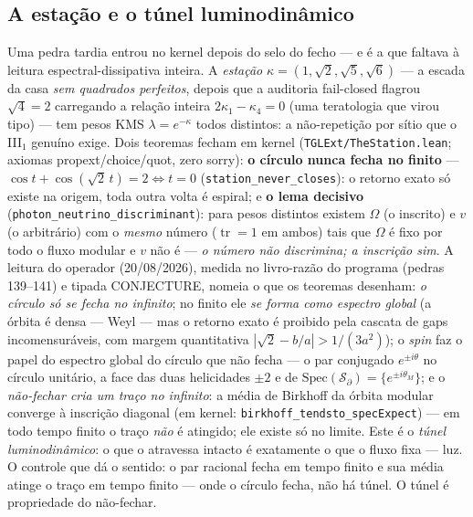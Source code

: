 \documentclass[11pt]{article}
\theoremstyle{definition}\newtheorem{deriv}{Derivação}
\begin{document}
\subsection*{A estação e o túnel luminodinâmico}Uma pedra tardia entrou no kernel depois do selo do fecho --- e é a que faltava à leitura espectral-dissipativa inteira. A \emph{estação} $\kappa=(1,\sqrt2,\sqrt5,\sqrt6)$ --- a escada da casa \emph{sem quadrados perfeitos}, depois que a auditoria fail-closed flagrou $\sqrt4=2$ carregando a relação inteira $2\kappa_1-\kappa_4=0$ (uma teratologia que virou tipo) --- tem pesos KMS $\lambda=e^{-\kappa}$ todos distintos: a não-repetição por sítio que o III$_1$ genuíno exige. Dois teoremas fecham em kernel (\texttt{TGLExt/TheStation.lean}; axiomas propext/choice/quot, zero sorry): \textbf{o círculo nunca fecha no finito} --- $\cos t+\cos(\sqrt2\,t)=2\iff t=0$ (\texttt{station\_never\_closes}): o retorno exato só existe na origem, toda outra volta é espiral; e \textbf{o lema decisivo} (\texttt{photon\_neutrino\_discriminant}): para pesos distintos existem $\Omega$ (o inscrito) e $v$ (o arbitrário) com o \emph{mesmo} número ($\operatorname{tr}=1$ em ambos) tais que $\Omega$ é fixo por todo o fluxo modular e $v$ não é --- \emph{o número não discrimina; a inscrição sim}. A leitura do operador (20/08/2026), medida no livro-razão do programa (pedras 139--141) e tipada \textsf{CONJECTURE}, nomeia o que os teoremas desenham: \emph{o círculo só se fecha no infinito}; no finito ele \emph{se forma como espectro global} (a órbita é densa --- Weyl --- mas o retorno exato é proibido pela cascata de gaps incomensuráveis, com margem quantitativa $|\sqrt2-b/a|>1/(3a^2)$); o \emph{spin} faz o papel do espectro global do círculo que não fecha --- o par conjugado $e^{\pm i\theta}$ no círculo unitário, a face das duas helicidades $\pm2$ e de $\mathrm{Spec}(\mathcal S_\partial)=\{e^{\pm i\theta_M}\}$; e o \emph{não-fechar cria um traço no infinito}: a média de Birkhoff da órbita modular converge à inscrição diagonal (em kernel: \texttt{birkhoff\_tendsto\_specExpect}) --- em todo tempo finito o traço \emph{não} é atingido; ele existe só no limite. Este é o \emph{túnel luminodinâmico}: o que o atravessa intacto é exatamente o que o fluxo fixa --- luz. O controle que dá o sentido: o par racional fecha em tempo finito e sua média atinge o traço em tempo finito --- onde o círculo fecha, não há túnel. O túnel é propriedade do não-fechar.
\end{document}
